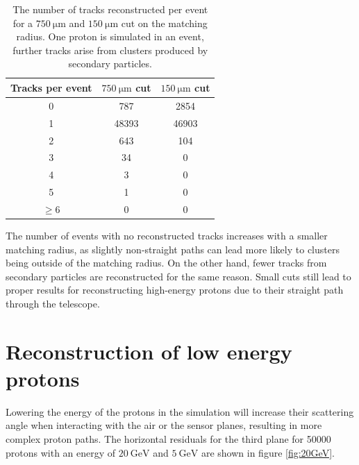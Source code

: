 \begin{table}
  \centering
  \begin{tabular}{c | c c}
    \toprule
    Tracks per event &  $\SI{750}{\micro\meter}$ cut & $\SI{150}{\micro\meter}$ cut\\
    \midrule
    0 & 787    & 2854  \\
    1 & 48393  & 46903  \\
    2 & 643    & 104  \\
    3 & 34     & 0  \\
    4 & 3      & 0   \\
    5 & 1      & 0    \\
    $\geq$6 & 0 & 0 \\
  \end{tabular}
  \caption{The number of tracks reconstructed per event for a
  $\SI{750}{\micro\meter}$ and $\SI{150}{\micro\meter}$ cut on the
  matching radius. One proton is simulated in an event, further tracks arise from clusters
  produced by secondary particles.}
  \label{tab:cluster_per_track}
\end{table}

The number of events with no reconstructed tracks increases with a smaller matching radius, as slightly non-straight paths can lead
more likely to clusters being outside of the matching radius. On the other hand, fewer tracks from secondary particles are reconstructed
for the same reason. Small cuts still lead to proper results
for reconstructing high-energy protons due to their straight path through the telescope.



\section{Reconstruction of low energy protons}\label{sec:energy}
Lowering the energy of the protons in the simulation will increase their scattering angle when interacting with the air or the sensor
planes, resulting in more complex proton paths.
The horizontal residuals for the third plane for 50000 protons with an energy of $\SI{20}{\giga\eV}$ and $\SI{5}{\GeV}$ are shown in figure \ref{fig:20GeV}.

